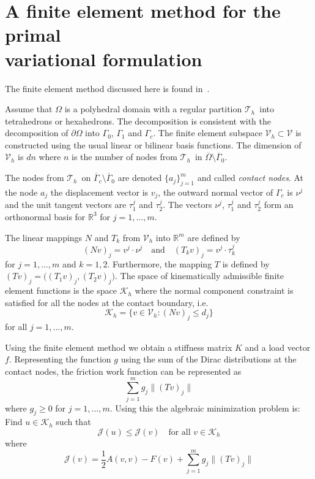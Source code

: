 \documentclass[12pt,a4paper]{article}
\numberwithin{equation}{section}
\numberwithin{table}{section}
\numberwithin{figure}{section}
\newcommand{\R}{\ensuremath{\mathbb{R}}}
\newcommand{\J}{\ensuremath{\mathcal{J}}}
\newcommand{\half}{\ensuremath{\frac{1}{2}}}
\newcommand{\dOmega}{{\partial\Omega}}
\newcommand{\V}{\ensuremath{\mathcal{V}}}
\newcommand{\K}{\ensuremath{\mathcal{K}}}
\newcommand{\Kh}{\ensuremath{\K_h}}
\newcommand{\Vh}{{\mathcal V}_h}
\newcommand{\Th}{\ensuremath{{\mathcal T}_h}}
\providecommand{\norm}[1]{\lVert #1 \rVert}
\newcommand{\qforall}{\quad\text{for all }}
\begin{document}
\section{A finite element method for the primal\\ variational formulation}
\label{sec:finite-elem-meth}

The finite element method discussed here is found in~\cite{haslinger04:3dContact}.

Assume that $\Omega$ is a polyhedral domain with a regular partition \Th\ into
tetrahedrons or hexahedrons.  The decomposition is consistent with the decomposition of
$\dOmega$ into $\Gamma_0$, $\Gamma_1$ and $\Gamma_c$.  The finite element subspace
$\Vh\subset\V$ is constructed using the usual linear or bilinear basis functions.  The
dimension of $\Vh$ is $d n$ where $n$ is the number of nodes from \Th\ in
$\overline{\Omega} \setminus \overline{\Gamma}_0$.

The nodes from \Th\ on $\overline{\Gamma}_c \setminus \overline{\Gamma}_0$ are denoted
$\{a_j\}_{j=1}^{m}$ and called \emph{contact nodes}.  At the node $a_j$ the displacement
vector is $v_j$, the outward normal vector of $\Gamma_c$ is $\nu^j$ and the unit tangent
vectors are $\tau_1^j$ and $\tau_2^j$.  The vectors $\nu^j$, $\tau_1^j$ and $\tau_2^j$
form an orthonormal basis for $\R^3$ for $j=1,\dots,m$.

The linear mappings $N$ and $T_k$ from $\Vh$ into $\R^m$ are defined by
\begin{equation}
  \label{eq:11}
  (Nv)_j = v^j\cdot\nu^j\quad\text{and}\quad (T_k v)_j = v^j\cdot \tau_k^j
\end{equation}
for $j=1,\dotsc,m$ and $k=1,2$.  Furthermore, the mapping $T$ is defined by $(Tv)_j =
\bigl( (T_1 v)_j, (T_2 v)_j \bigr)$.  The space of kinematically admissible finite element
functions is the space $\K_h$ where the normal component constraint is satisfied for all
the nodes at the contact boundary, i.e.
\begin{equation}
  \label{eq:4}
  \K_h = \{ v\in\Vh \colon (N v)_j \le d_j\}
\end{equation}
for all $j=1,\dotsc,m$.

Using the finite element method we obtain a stiffness matrix $K$ and a load vector $f$.
Representing the function $g$ using the sum of the Dirac distributions at the contact
nodes, the friction work function can be represented as
\begin{equation}
  \label{eq:3}
  \sum_{j=1}^m g_j \norm{(T v)_j}
\end{equation}
where $g_j \ge 0$ for $j=1,\dots,m$.  Using this the algebraic minimization problem is:
Find $u\in\Kh$ such that
\begin{equation}
  \label{eq:5}
  \J(u) \le \J(v) \qforall v\in\Kh
\end{equation}
where
\begin{equation}
  \label{eq:8}
  \J(v) = \half A(v,v) - F(v) + \sum_{j=1}^m g_j \norm{(T v)_j}
\end{equation}
\end{document}
